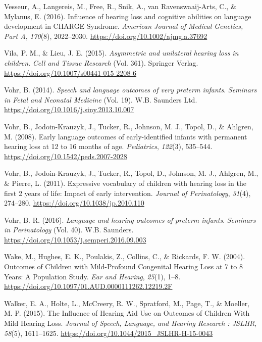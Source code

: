 \documentclass[english,man]{apa6}
\begin{document}
\leavevmode\hypertarget{ref-vesseur2016}{}%
Vesseur, A., Langereis, M., Free, R., Snik, A., van Ravenswaaij-Arts, C., \& Mylanus, E. (2016). Influence of hearing loss and cognitive abilities on language development in CHARGE Syndrome. \emph{American Journal of Medical Genetics, Part A}, \emph{170}(8), 2022--2030. \url{https://doi.org/10.1002/ajmg.a.37692}

\leavevmode\hypertarget{ref-vila2015}{}%
Vila, P. M., \& Lieu, J. E. (2015). \emph{Asymmetric and unilateral hearing loss in children}. \emph{Cell and Tissue Research} (Vol. 361). Springer Verlag. \url{https://doi.org/10.1007/s00441-015-2208-6}

\leavevmode\hypertarget{ref-vohr2014}{}%
Vohr, B. (2014). \emph{Speech and language outcomes of very preterm infants}. \emph{Seminars in Fetal and Neonatal Medicine} (Vol. 19). W.B. Saunders Ltd. \url{https://doi.org/10.1016/j.siny.2013.10.007}

\leavevmode\hypertarget{ref-vohr2008}{}%
Vohr, B., Jodoin-Krauzyk, J., Tucker, R., Johnson, M. J., Topol, D., \& Ahlgren, M. (2008). Early language outcomes of early-identified infants with permanent hearing loss at 12 to 16 months of age. \emph{Pediatrics}, \emph{122}(3), 535--544. \url{https://doi.org/10.1542/peds.2007-2028}

\leavevmode\hypertarget{ref-vohr2011}{}%
Vohr, B., Jodoin-Krauzyk, J., Tucker, R., Topol, D., Johnson, M. J., Ahlgren, M., \& Pierre, L. (2011). Expressive vocabulary of children with hearing loss in the first 2 years of life: Impact of early intervention. \emph{Journal of Perinatology}, \emph{31}(4), 274--280. \url{https://doi.org/10.1038/jp.2010.110}

\leavevmode\hypertarget{ref-vohr2016}{}%
Vohr, B. R. (2016). \emph{Language and hearing outcomes of preterm infants}. \emph{Seminars in Perinatology} (Vol. 40). W.B. Saunders. \url{https://doi.org/10.1053/j.semperi.2016.09.003}

\leavevmode\hypertarget{ref-wake2004}{}%
Wake, M., Hughes, E. K., Poulakis, Z., Collins, C., \& Rickards, F. W. (2004). Outcomes of Children with Mild-Profound Congenital Hearing Loss at 7 to 8 Years: A Population Study. \emph{Ear and Hearing}, \emph{25}(1), 1--8. \url{https://doi.org/10.1097/01.AUD.0000111262.12219.2F}

\leavevmode\hypertarget{ref-walker2015}{}%
Walker, E. A., Holte, L., McCreery, R. W., Spratford, M., Page, T., \& Moeller, M. P. (2015). The Influence of Hearing Aid Use on Outcomes of Children With Mild Hearing Loss. \emph{Journal of Speech, Language, and Hearing Research : JSLHR}, \emph{58}(5), 1611--1625. \url{https://doi.org/10.1044/2015_JSLHR-H-15-0043}
\end{document}
